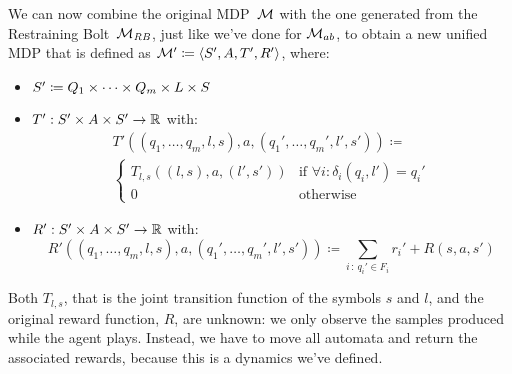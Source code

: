 We can now combine the original MDP~$\mathcal{M}$ with the one generated from the
Restraining Bolt~$\mathcal{M}_{\text{\textit{RB}}}$, just like we've done for $\mathcal{M}_{ab}$,
to obtain a new unified MDP that is defined as $\mathcal{M}' \coloneqq \langle S',
A, T', R' \rangle$, where:
\begin{itemize}
	\item $S' \coloneqq Q_1 \times \dots \times Q_m \times L \times S$
	\item $T' : S' \times A \times S' \to \mathbb{R}$ with:
		\begin{multline*}
			T'((q_1, \dots, q_m, l, s), a, (q_1', \dots, q_m', l', s')) \coloneqq \\
			\begin{cases}
				T_{l,s}((l,s), a, (l',s')) &
					\text{if $\forall i : \delta_i(q_i, l') = q_i'$} \\
				0 & \text{otherwise}
			\end{cases}
		\end{multline*}
	\item $R' : S' \times A \times S' \to \mathbb{R}$ with:
		\[
			R'((q_1, \dots, q_m, l, s), a, (q_1', \dots, q_m', l', s')) \coloneqq
			\sum_{i\, :\, q_i' \in F_i} r_i' + R(s, a, s')
		\]
\end{itemize}
\label{page:rb-extended-mdp}
Both $T_{l,s}$, that is the joint transition function of the symbols $s$ and
$l$, and the original reward function, $R$, are unknown: we only observe the
samples produced while the agent plays. Instead, we have to move all
automata and return the associated rewards, because this is a dynamics we've
defined.


